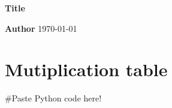 \documentclass[a4paper,10pt]{article}
\begin{document}
\begin{center}
  \begin{huge} \textbf{Title}  \end{huge} \linebreak
  \textbf{Author} \linebreak
  \today
\end{center}

\section{Mutiplication table}

\begin{python}[frame=trBR] 
#Paste Python code here!
\end{python}
\end{document}
